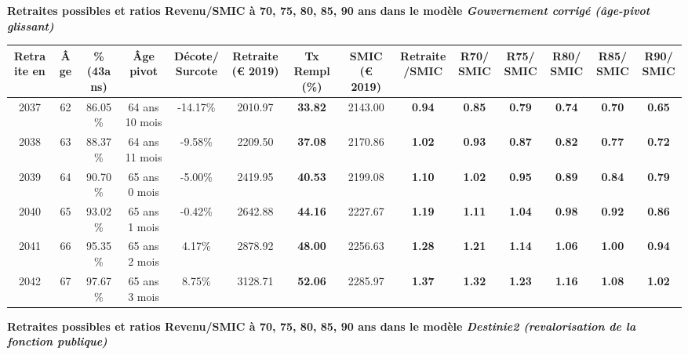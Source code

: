  \vspace{0.1cm} 
{\bf \noindent Retraites possibles et ratios Revenu/SMIC à 70, 75, 80, 85, 90 ans dans le modèle \emph{Gouvernement corrigé (âge-pivot glissant)}}  
 
\begin{adjustbox}{max width=\textwidth} 
\begin{tabular}[htb]{|c|c||c|c|c||c|c||c|c||c|c|c|c|c|} 
\hline 
 Retraite en &  Âge &  \%(43ans) &  Âge pivot &  Décote/Surcote &  Retraite (\euro{} 2019) &  Tx Rempl(\%) &  SMIC (\euro{} 2019) &  Retraite/SMIC &  R70/SMIC &  R75/SMIC &  R80/SMIC &  R85/SMIC &  R90/SMIC \\ 
\hline \hline 
 2037 &  62 &  86.05\% &  64 ans 10 mois &  -14.17\% &  2010.97 &  {\bf 33.82} &  2143.00 &  {\bf {\color{red} 0.94}} &  {\bf {\color{red} 0.85}} &  {\bf {\color{red} 0.79}} &  {\bf {\color{red} 0.74}} &  {\bf {\color{red} 0.70}} &  {\bf {\color{red} 0.65}} \\ 
\hline 
 2038 &  63 &  88.37\% &  64 ans 11 mois &  -9.58\% &  2209.50 &  {\bf 37.08} &  2170.86 &  {\bf 1.02} &  {\bf {\color{red} 0.93}} &  {\bf {\color{red} 0.87}} &  {\bf {\color{red} 0.82}} &  {\bf {\color{red} 0.77}} &  {\bf {\color{red} 0.72}} \\ 
\hline 
 2039 &  64 &  90.70\% &  65 ans 0 mois &  -5.00\% &  2419.95 &  {\bf 40.53} &  2199.08 &  {\bf 1.10} &  {\bf 1.02} &  {\bf {\color{red} 0.95}} &  {\bf {\color{red} 0.89}} &  {\bf {\color{red} 0.84}} &  {\bf {\color{red} 0.79}} \\ 
\hline 
 2040 &  65 &  93.02\% &  65 ans 1 mois &  -0.42\% &  2642.88 &  {\bf 44.16} &  2227.67 &  {\bf 1.19} &  {\bf 1.11} &  {\bf 1.04} &  {\bf {\color{red} 0.98}} &  {\bf {\color{red} 0.92}} &  {\bf {\color{red} 0.86}} \\ 
\hline 
 2041 &  66 &  95.35\% &  65 ans 2 mois &  4.17\% &  2878.92 &  {\bf 48.00} &  2256.63 &  {\bf 1.28} &  {\bf 1.21} &  {\bf 1.14} &  {\bf 1.06} &  {\bf {\color{red} 1.00}} &  {\bf {\color{red} 0.94}} \\ 
\hline 
 2042 &  67 &  97.67\% &  65 ans 3 mois &  8.75\% &  3128.71 &  {\bf 52.06} &  2285.97 &  {\bf 1.37} &  {\bf 1.32} &  {\bf 1.23} &  {\bf 1.16} &  {\bf 1.08} &  {\bf 1.02} \\ 
\hline 
\hline 
\end{tabular} 
\end{adjustbox} 
 
 \vspace{0.1cm} 
{\bf \noindent Retraites possibles et ratios Revenu/SMIC à 70, 75, 80, 85, 90 ans dans le modèle \emph{Destinie2 (revalorisation de la fonction publique)}}  
 
